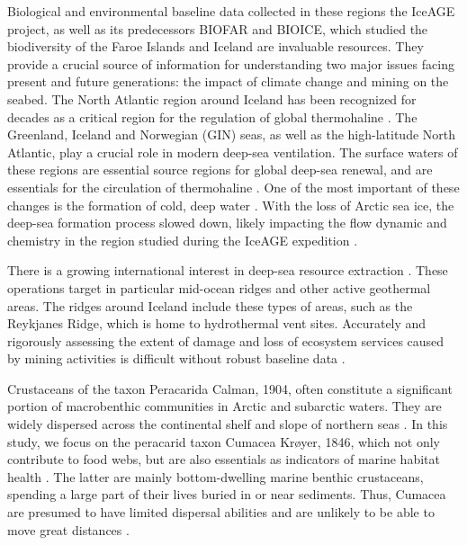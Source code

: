 Biological and environmental baseline data collected in these regions the IceAGE project, as well as its predecessors BIOFAR and BIOICE, which studied the biodiversity of the Faroe Islands and Iceland \citep{meisner_prefacebiodiversity_2018} are invaluable resources. They provide a crucial source of information for understanding two major issues facing present and future generations: the impact of climate change and mining on the seabed. The North Atlantic region around Iceland has been recognized for decades as a critical region for the regulation of global thermohaline \citep{meisner_prefacebiodiversity_2018}. The Greenland, Iceland and Norwegian (GIN) seas, as well as the high-latitude North Atlantic, play a crucial role in modern deep-sea ventilation. The surface waters of these regions are essential source regions for global deep-sea renewal, and are essentials for the circulation of thermohaline \citep{johannessen_relationship_1994}. One of the most important of these changes is the formation of cold, deep water \citep{meisner_prefacebiodiversity_2018}. With the loss of Arctic sea ice, the deep-sea formation process slowed down, likely impacting the flow dynamic and chemistry in the region studied during the IceAGE expedition \citep{meisner_prefacebiodiversity_2018}.

There is a growing international interest in deep-sea resource extraction \citep{mengerink_call_2014}. These operations target in particular mid-ocean ridges and other active geothermal areas. The ridges around Iceland include these types of areas, such as the Reykjanes Ridge, which is home to hydrothermal vent sites. Accurately and rigorously assessing the extent of damage and loss of ecosystem services caused by mining activities is difficult without robust baseline data \citep{meisner_prefacebiodiversity_2018}.

Crustaceans of the taxon Peracarida Calman, 1904, often constitute a significant portion of macrobenthic communities in Arctic and subarctic waters. They are widely dispersed across the continental shelf and slope of northern seas \citep{stransky_diversity_2010}. In this study, we focus on the peracarid taxon Cumacea Krøyer, 1846, which not only contribute to food webs, but are also essentials as indicators of marine habitat health \citep{stransky_diversity_2010}. The latter are mainly bottom-dwelling marine benthic crustaceans, spending a large part of their lives buried in or near sediments. Thus, Cumacea are presumed to have limited dispersal abilities and are unlikely to be able to move great distances \citep{uhlir_adding_2021}.

